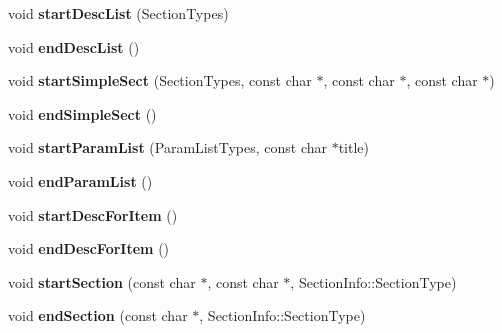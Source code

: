 \begin{DoxyCompactItemize}
\item 
\hypertarget{class_latex_generator_a9c0bb2efe62ee473e0751b8db35e847a}{void {\bfseries start\-Desc\-List} (Section\-Types)}\label{class_latex_generator_a9c0bb2efe62ee473e0751b8db35e847a}

\item 
\hypertarget{class_latex_generator_ab6e97c139518cd722a4da899d4bcf366}{void {\bfseries end\-Desc\-List} ()}\label{class_latex_generator_ab6e97c139518cd722a4da899d4bcf366}

\item 
\hypertarget{class_latex_generator_af78a3d7bf076c8f5e6bb859460a3437d}{void {\bfseries start\-Simple\-Sect} (Section\-Types, const char $\ast$, const char $\ast$, const char $\ast$)}\label{class_latex_generator_af78a3d7bf076c8f5e6bb859460a3437d}

\item 
\hypertarget{class_latex_generator_a845408bbcbfed31523c20fd170dd8b45}{void {\bfseries end\-Simple\-Sect} ()}\label{class_latex_generator_a845408bbcbfed31523c20fd170dd8b45}

\item 
\hypertarget{class_latex_generator_a1f8233d3d8c28205b99a8fd06ecdad02}{void {\bfseries start\-Param\-List} (Param\-List\-Types, const char $\ast$title)}\label{class_latex_generator_a1f8233d3d8c28205b99a8fd06ecdad02}

\item 
\hypertarget{class_latex_generator_a0cea756e6f65da408378bedffe2b67d1}{void {\bfseries end\-Param\-List} ()}\label{class_latex_generator_a0cea756e6f65da408378bedffe2b67d1}

\item 
\hypertarget{class_latex_generator_aaeedab997793b96cdfc94f8b628d5a80}{void {\bfseries start\-Desc\-For\-Item} ()}\label{class_latex_generator_aaeedab997793b96cdfc94f8b628d5a80}

\item 
\hypertarget{class_latex_generator_a5cae5c5213649bfad6105e91ac818870}{void {\bfseries end\-Desc\-For\-Item} ()}\label{class_latex_generator_a5cae5c5213649bfad6105e91ac818870}

\item 
\hypertarget{class_latex_generator_a32fffbabcb45b670e3a6ac0471b99c50}{void {\bfseries start\-Section} (const char $\ast$, const char $\ast$, Section\-Info\-::\-Section\-Type)}\label{class_latex_generator_a32fffbabcb45b670e3a6ac0471b99c50}

\item 
\hypertarget{class_latex_generator_ab32c634e6ee9223b4c5d77b1e3d8c082}{void {\bfseries end\-Section} (const char $\ast$, Section\-Info\-::\-Section\-Type)}\label{class_latex_generator_ab32c634e6ee9223b4c5d77b1e3d8c082}


\end{DoxyCompactItemize}
